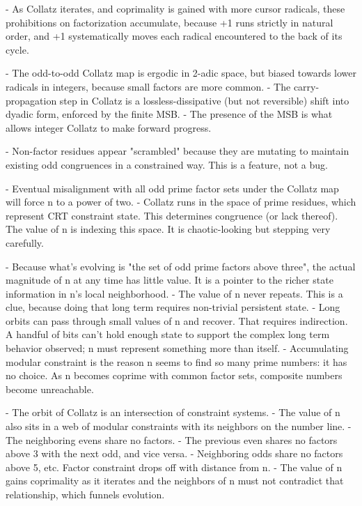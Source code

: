 \documentclass[12pt]{article}
\theoremstyle{plain}
\theoremstyle{definition}
\begin{document}
- As Collatz iterates, and coprimality is gained with more cursor radicals, these prohibitions on factorization accumulate, because +1 runs strictly in natural order, and +1 systematically moves each radical encountered to the back of its cycle.


- The odd-to-odd Collatz map is ergodic in 2-adic space, but biased towards lower radicals in integers, because small factors are more common.
- The carry-propagation step in Collatz is a lossless-dissipative (but not reversible) shift into dyadic form, enforced by the finite MSB.
- The presence of the MSB is what allows integer Collatz to make forward progress.

- Non-factor residues appear "scrambled" because they are mutating to maintain existing odd congruences in a constrained way. This is a feature, not a bug.

- Eventual misalignment with all odd prime factor sets under the Collatz map will force n to a power of two.
- Collatz runs in the space of prime residues, which represent CRT constraint state. This determines congruence (or lack thereof). The value of n is indexing this space. It is chaotic-looking but stepping very carefully.

- Because what's evolving is "the set of odd prime factors above three", the actual magnitude of n at any time has little value. It is a pointer to the richer state information in n's local neighborhood.
- The value of n never repeats. This is a clue, because doing that long term requires non-trivial persistent state.
- Long orbits can pass through small values of n and recover. That requires indirection. A handful of bits can't hold enough state to support the complex long term behavior observed; n must represent something more than itself.
- Accumulating modular constraint is the reason n seems to find so many prime numbers: it has no choice. As n becomes coprime with common factor sets, composite numbers become unreachable.

- The orbit of Collatz is an intersection of constraint systems.
- The value of n also sits in a web of modular constraints with its neighbors on the number line.
  - The neighboring evens share no factors.
  - The previous even shares no factors above 3 with the next odd, and vice versa.
  - Neighboring odds share no factors above 5, etc. Factor constraint drops off with distance from n.
- The value of n gains coprimality as it iterates and the neighbors of n must not contradict that relationship, which funnels evolution.
\end{document}
